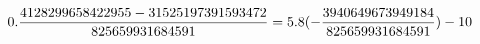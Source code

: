 \documentclass[preview]{standalone}
\begin{document}
\begin{align*}
\special{dvisvgm:raw <g id='unique000'>}0.\frac{4128299658422955 - 31525197391593472}{825659931684591} = 5.8 (- \frac{3940649673949184}{825659931684591}) - 10\special{dvisvgm:raw </g>}
\end{align*}
\end{document}
